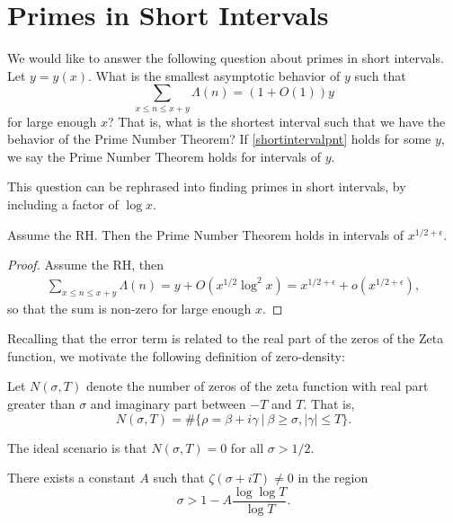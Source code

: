 \section{Primes in Short Intervals}
We would like to answer the following question about primes in short intervals. Let $y=y(x)$. What is the smallest asymptotic behavior of $y$
such that \begin{equation}\label{shortintervalpnt}
\sum_{x\leq n \leq x+y} \Lambda(n) = (1+O(1)) y
\end{equation}
for large enough $x$? That is, what is the shortest interval such that we have the behavior of the Prime Number Theorem? If \ref{shortintervalpnt} holds for some $y$,
we say the Prime Number Theorem holds for intervals of $y$.
\begin{remark}
    This question can be rephrased into finding primes in short intervals, by including a factor of $\log x$. 
\end{remark} 
\begin{proposition}
    Assume the RH. Then the Prime Number Theorem holds in intervals of $x^{1/2+\epsilon}$.
\end{proposition}
\begin{proof}
    Assume the RH, then
    \begin{align*}
        \sum_{x\leq n \leq x+y} \Lambda(n)=
        y+O(x^{1/2}\log^2 x) = x^{1/2+\epsilon} + o(x^{1/2+\epsilon}),
    \end{align*}
    so that the sum is non-zero for large enough $x$.
\end{proof}
Recalling that the error term is related to the real part of the zeros of the Zeta function, we motivate the following definition of zero-density:
\begin{definition}
    Let $N(\sigma, T)$ denote the number of zeros of the zeta function with real part greater than $\sigma$ and imaginary part between $-T$ and $T$. That is,\[
        N(\sigma,T) = \# \{\rho = \beta + i\gamma \ | \ \beta \geq\sigma, |\gamma|\leq T\}.
    \]
\end{definition}
\begin{remark}
    The ideal scenario is that $N(\sigma,T)=0$ for all $\sigma> 1/2$. 
\end{remark}
\begin{theorem}[Chudakov] 
    There exists a constant $A$ such that $\zeta(\sigma+iT)\neq 0$ in the region \begin{equation*}
        \sigma > 1 - A\frac{\log \log T}{\log T}.
    \end{equation*}
\end{theorem}
